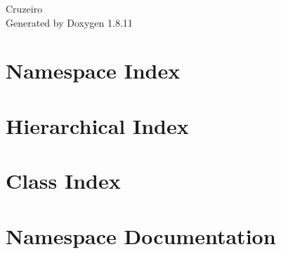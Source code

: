 \documentclass[twoside]{book}
\newcommand{\+}{\discretionary{\mbox{\scriptsize$\hookleftarrow$}}{}{}}
\newcommand{\clearemptydoublepage}{%
  \newpage{\pagestyle{empty}\cleardoublepage}%
}
\begin{document}
\hypersetup{pageanchor=false,
             bookmarksnumbered=true,
             pdfencoding=unicode
            }
\begin{titlepage}
\vspace*{7cm}
\begin{center}%
{\Large Cruzeiro }\\
\vspace*{1cm}
{\large Generated by Doxygen 1.8.11}\\
\end{center}
\end{titlepage}
\clearemptydoublepage
\tableofcontents
\clearemptydoublepage
{}
\hypersetup{pageanchor=true}

\chapter{Namespace Index}

\chapter{Hierarchical Index}

\chapter{Class Index}

\chapter{Namespace Documentation}




























\end{document}
